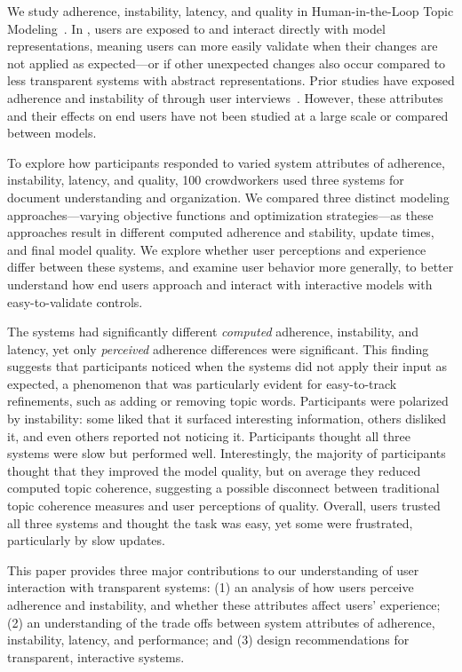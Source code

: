 We study adherence, instability, latency, and quality in Human-in-the-Loop Topic Modeling~\cite[\hltm{}]{Andrzejewski2009IncorporatingPriors.}. In \hltm{}, users are exposed to and interact directly with model representations, meaning users can more easily validate when their changes are not applied as expected---or if other unexpected changes also occur compared to less transparent systems with abstract representations. Prior studies have exposed adherence and instability of \hltm{} through user interviews~\cite{Smith2018ClosingSystem,Lee2017TheModels}. However, these attributes and their effects on end users have
not been studied at a large scale or compared between models.

To explore how participants responded to varied system attributes of adherence, instability, latency, and quality, 100 crowdworkers used
three \hltm{} systems for document understanding and organization.  
We compared three distinct modeling approaches---varying objective functions and optimization strategies---as these approaches result in different computed adherence and stability, update times, and final model quality.
We explore whether user perceptions and experience differ between these systems,
and examine user behavior more generally, to better understand how end users approach and interact with interactive models with easy-to-validate controls.

The systems had significantly different \textit{computed} adherence, instability, and latency, yet only \textit{perceived} adherence differences were significant.
This finding suggests that participants noticed when the systems did not apply their input as expected, a phenomenon that  was particularly evident for easy-to-track refinements, such as adding or removing topic words. Participants were polarized by instability: some liked that it surfaced interesting information, others disliked it, and even others reported not noticing it.
Participants thought all three systems were slow but performed well. Interestingly, the majority of participants thought that they improved the model quality, but on average they reduced computed topic coherence, suggesting a possible disconnect between traditional topic coherence measures and user perceptions of \hltm{} quality.
Overall, users trusted all three systems and thought the task was easy, yet some were frustrated, particularly by slow updates.


This paper provides three major contributions to our understanding of user interaction with transparent systems:  (1) an analysis of how users perceive adherence and instability, and whether these attributes affect users' experience; (2) an understanding of the trade offs between system attributes of adherence, instability, latency, and performance; and (3) design recommendations for transparent, interactive systems.


